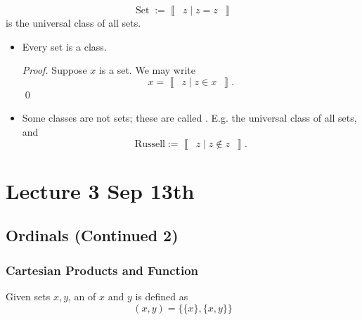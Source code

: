 \documentclass[notoc,notitlepage]{tufte-book}
\newcommand{\class}[1]{\left\llbracket \enspace #1 \enspace \right\rrbracket}
\DeclareMathOperator{\Set}{Set }
\begin{document}
\begin{eg}
  \begin{equation*}
    \Set := \class{ z \mid z = z }
  \end{equation*}
  is the universal class of all sets.
\end{eg}

\begin{note}
  \begin{itemize}
    \item Every set is a class.
      \begin{proof}
        Suppose $x$ is a set. We may write
        \begin{equation*}
          x = \class{ z \mid z \in x }.
        \end{equation*}\qed
      \end{proof}

    \item Some classes are not sets; these are called . E.g. the universal class of all sets, and
      \begin{equation*}
        \text{Russell} := \class{ z \mid z \notin z }.
      \end{equation*}
  \end{itemize}
\end{note}




\chapter{Lecture 3 Sep 13th}%
\label{chp:lecture_3_sep_13th}

\section{Ordinals (Continued 2)}%
\label{sec:ordinals_continued_2}

\subsection{Cartesian Products and Function}%
\label{sub:cartesian_products_and_function}

\begin{defn}
\label{defn:ordered_pairs}
  Given sets $x, y$, an  of $x$ and $y$ is defined as
  \begin{equation*}
    (x, y) = \{ \{ x \}, \{ x, y \} \}
  \end{equation*}
\end{defn}
\end{document}
